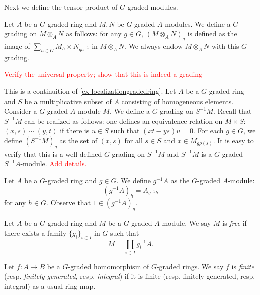 Next we define the tensor product of $G$-graded modules.
\begin{definition}
    Let $A$ be a $G$-graded ring and $M,N$ be $G$-graded $A$-modules. We define a $G$-grading on $M\otimes_A N$ as follows: for any $g\in G$, $(M\otimes_A N)_g$ is defined as the image of $\sum_{h\in G}M_h\times N_{gh^{-1}}$ in $M\otimes_A N$. We always endow $M\otimes_A N$ with this $G$-grading.
\end{definition}
\textcolor{red}{Verify the universal property; show that this is indeed a grading}

\begin{example}\label{ex-localizationgradedmodule}
    This is a continuition of \cref{ex-localizationgradedring}.
    Let $A$ be a $G$-graded ring and $S$ be a multiplicative subset of $A$ consisting of homogeneous elements. Consider a $G$-graded $A$-module $M$. We define a $G$-grading on $S^{-1}M$. Recall that $S^{-1}M$ can be realized as follows: one defines an equivalence relation on $M\times S$: $(x,s)\sim (y,t)$ if there is $u\in S$ such that $(xt-ys)u=0$. For each $g\in G$, we define $(S^{-1}M)_g$ as the set of $(x,s)$ for all $s\in S$ and $x\in M_{g\rho(s)}$. It is easy to verify that this is a well-defined $G$-grading on $S^{-1}M$ and $S^{-1}M$ is a $G$-graded $S^{-1}A$-module.  \textcolor{red}{Add details.}
\end{example}

\begin{example}\label{ex-twistmodule}
    Let $A$ be a $G$-graded ring and $g\in G$. We define $g^{-1}A$ as the $G$-graded $A$-module:
    \[
        (g^{-1}A)_h=A_{g^{-1}h}
    \]
    for any $h\in G$. Observe that $1\in (g^{-1}A)_g$.
\end{example}

\begin{definition}
    Let $A$ be a $G$-graded ring and $M$ be a $G$-graded $A$-module. We say $M$ is \emph{free} if there exists a family $\{g_i\}_{i\in I}$ in $G$ such that
    \[
        M=\coprod_{i\in I} g_i^{-1}A.  
    \]
\end{definition}

\begin{definition}
    Let $f:A\rightarrow B$ be a $G$-graded homomorphism of $G$-graded rings. We say $f$ is \emph{finite} (resp. \emph{finitely generated}, resp. \emph{integral}) if it is finite (resp. finitely generated, resp. integral) as a usual ring map.
\end{definition}

